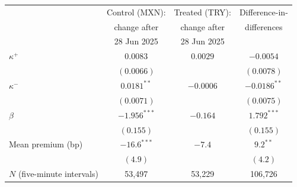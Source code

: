 \begin{tabular}{lccc}
\toprule
 & Control (MXN): & Treated (TRY): & Difference-in- \\
 & change after & change after & differences \\
 & 28 Jun 2025 & 28 Jun 2025 & \\
\midrule
$\kappa^+$ & $0.0083$ & $0.0029$ & $-0.0054$ \\
 & $(0.0066)$ & & $(0.0078)$ \\
$\kappa^-$ & $0.0181^{**}$ & $-0.0006$ & $-0.0186^{**}$ \\
 & $(0.0071)$ & & $(0.0075)$ \\
$\beta$ & $-1.956^{***}$ & $-0.164$ & $1.792^{***}$ \\
 & $(0.155)$ & & $(0.155)$ \\
Mean premium (bp) & $-16.6^{***}$ & $-7.4$ & $9.2^{**}$ \\
 & $(4.9)$ & & $(4.2)$ \\
\midrule
$N$ (five-minute intervals) & 53,497 & 53,229 & 106,726 \\
\bottomrule
\end{tabular}
